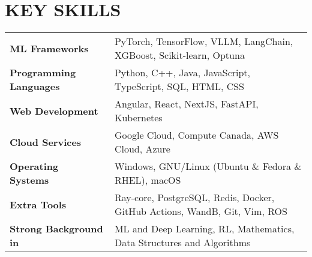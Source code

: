 \section{KEY SKILLS}
\begin{tabular}{ @{} >{\bfseries}l @{\hspace{6ex}} l }
ML Frameworks\ & PyTorch, TensorFlow, VLLM, LangChain, XGBoost, Scikit-learn, Optuna \\
Programming Languages\ & Python, C++, Java, JavaScript, TypeScript, SQL, HTML, CSS \\
Web Development\ & Angular, React, NextJS, FastAPI, Kubernetes \\
Cloud Services\ & Google Cloud, Compute Canada, AWS Cloud, Azure\\ 
Operating Systems\ & Windows, GNU/Linux (Ubuntu \& Fedora \& RHEL), macOS \\
Extra Tools\ & Ray-core, PostgreSQL, Redis, Docker, GitHub Actions, WandB, Git, Vim, ROS \\
Strong Background in\ & ML and Deep Learning, RL, Mathematics, Data Structures and Algorithms  \\
\end{tabular}